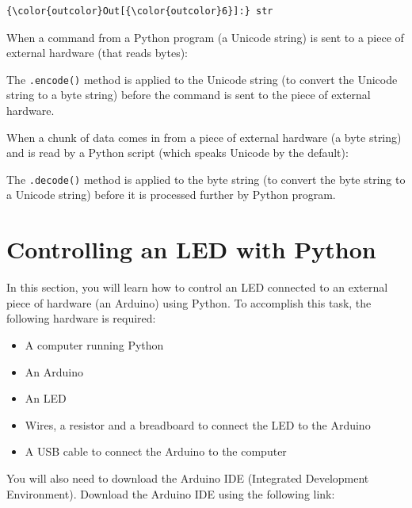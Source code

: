 \documentclass{book}
\providecommand{\tightlist}{%
      \setlength{\itemsep}{0pt}\setlength{\parskip}{0pt}}
\begin{document}
\begin{Verbatim}[commandchars=\\\{\}]
{\color{outcolor}Out[{\color{outcolor}6}]:} str
\end{Verbatim}
            

    
        When a command from a Python program (a Unicode string) is sent to a
piece of external hardware (that reads bytes):

The \lstinline!.encode()! method is applied to the Unicode string (to
convert the Unicode string to a byte string) before the command is sent
to the piece of external hardware.

When a chunk of data comes in from a piece of external hardware (a byte
string) and is read by a Python script (which speaks Unicode by the
default):

The \lstinline!.decode()! method is applied to the byte string (to
convert the byte string to a Unicode string) before it is processed
further by Python program.
    




    
        \section{Controlling an LED with
Python}\label{controlling-an-led-with-python}
    




    
        In this section, you will learn how to control an LED connected to an
external piece of hardware (an Arduino) using Python. To accomplish this
task, the following hardware is required:

\begin{itemize}
\tightlist
\item
  A computer running Python
\item
  An Arduino
\item
  An LED
\item
  Wires, a resistor and a breadboard to connect the LED to the Arduino
\item
  A USB cable to connect the Arduino to the computer
\end{itemize}
    




    
        You will also need to download the Arduino IDE (Integrated Development
Environment). Download the Arduino IDE using the following link:
\end{document}
